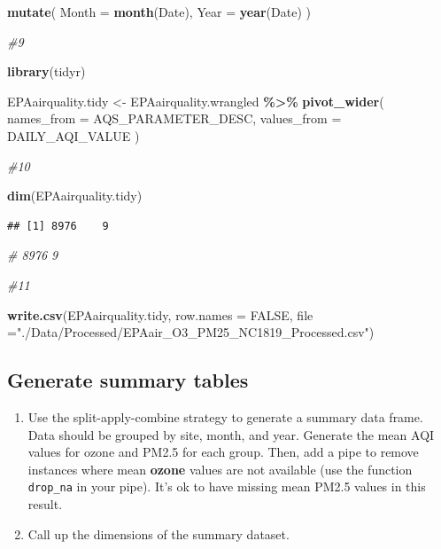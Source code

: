 \documentclass[
]{article}
\newenvironment{Shaded}{\begin{snugshade}}{\end{snugshade}}
\newcommand{\AttributeTok}[1]{\textcolor[rgb]{0.13,0.29,0.53}{#1}}
\newcommand{\CommentTok}[1]{\textcolor[rgb]{0.56,0.35,0.01}{\textit{#1}}}
\newcommand{\ConstantTok}[1]{\textcolor[rgb]{0.56,0.35,0.01}{#1}}
\newcommand{\FunctionTok}[1]{\textcolor[rgb]{0.13,0.29,0.53}{\textbf{#1}}}
\newcommand{\NormalTok}[1]{#1}
\newcommand{\OtherTok}[1]{\textcolor[rgb]{0.56,0.35,0.01}{#1}}
\newcommand{\SpecialCharTok}[1]{\textcolor[rgb]{0.81,0.36,0.00}{\textbf{#1}}}
\newcommand{\StringTok}[1]{\textcolor[rgb]{0.31,0.60,0.02}{#1}}
\begin{document}
\begin{Shaded}
\begin{Highlighting}[]
\FunctionTok{mutate}\NormalTok{(}
  \AttributeTok{Month =} \FunctionTok{month}\NormalTok{(Date),}
  \AttributeTok{Year  =} \FunctionTok{year}\NormalTok{(Date)}
\NormalTok{)}
  
  
  
\CommentTok{\#9}

\FunctionTok{library}\NormalTok{(tidyr)}

\NormalTok{EPAairquality.tidy }\OtherTok{\textless{}{-}}\NormalTok{ EPAairquality.wrangled }\SpecialCharTok{\%\textgreater{}\%}
\FunctionTok{pivot\_wider}\NormalTok{(}
  \AttributeTok{names\_from =}\NormalTok{ AQS\_PARAMETER\_DESC,}
  \AttributeTok{values\_from =}\NormalTok{ DAILY\_AQI\_VALUE}
\NormalTok{)}


\CommentTok{\#10}

\FunctionTok{dim}\NormalTok{(EPAairquality.tidy)}
\end{Highlighting}
\end{Shaded}

\begin{verbatim}
## [1] 8976    9
\end{verbatim}

\begin{Shaded}
\begin{Highlighting}[]
\CommentTok{\# 8976    9}


\CommentTok{\#11}


\FunctionTok{write.csv}\NormalTok{(EPAairquality.tidy, }\AttributeTok{row.names =} \ConstantTok{FALSE}\NormalTok{, }
          \AttributeTok{file =}\StringTok{"./Data/Processed/EPAair\_O3\_PM25\_NC1819\_Processed.csv"}\NormalTok{)}
\end{Highlighting}
\end{Shaded}

\subsection{Generate summary tables}\label{generate-summary-tables}

\begin{enumerate}
\def\labelenumi{\arabic{enumi}.}
\setcounter{enumi}{11}
\item
  Use the split-apply-combine strategy to generate a summary data frame.
  Data should be grouped by site, month, and year. Generate the mean AQI
  values for ozone and PM2.5 for each group. Then, add a pipe to remove
  instances where mean \textbf{ozone} values are not available (use the
  function \texttt{drop\_na} in your pipe). It's ok to have missing mean
  PM2.5 values in this result.
\item
  Call up the dimensions of the summary dataset.
\end{enumerate}
\end{document}
